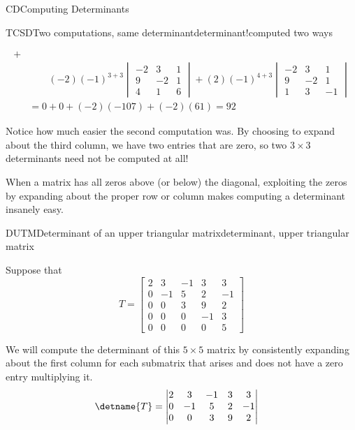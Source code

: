 \begin{subsect}{CD}{Computing Determinants}
\begin{example}{TCSD}{Two computations, same determinant}{determinant!computed two ways}
\begin{para}
\begin{align*}
+\\
%
&\quad\quad(-2)(-1)^{3+3}
\begin{vmatrix}
-2 & 3 & 1\\
9 & -2 & 1\\
4 & 1 & 6
\end{vmatrix}
+
(2)(-1)^{4+3}
\begin{vmatrix}
-2 & 3 & 1\\
9 & -2 & 1\\
1 & 3 & -1
\end{vmatrix}\\
&=0+0+(-2)(-107)+(-2)(61)=92
\end{align*}
\end{para}
%
\begin{para}Notice how much easier the second computation was.  By choosing to expand about the third column, we have two entries that are zero, so two $3\times 3$ determinants need not be computed at all!\end{para}
\end{example}
%
\begin{para}When a matrix has all zeros above (or below) the diagonal, exploiting the zeros by expanding about the proper row or column makes computing a determinant insanely easy.\end{para}
%
\begin{example}{DUTM}{Determinant of an upper triangular matrix}{determinant, upper triangular matrix}
\begin{para}Suppose that
%
\begin{equation*}
T=
\begin{bmatrix}
2 & 3 & -1 & 3 & 3\\
0 & -1 & 5 & 2 & -1\\
0 & 0 & 3 & 9 & 2\\
0 & 0 & 0 & -1 & 3\\
0 & 0 & 0 & 0 & 5
\end{bmatrix}
\end{equation*}
\end{para}
%
\begin{para}We will compute the determinant of this $5\times 5$ matrix by consistently expanding about the first column for each submatrix that arises and does not have a zero entry multiplying it.
%
\begin{align*}
\detname{T}&=
\begin{vmatrix}
2 & 3 & -1 & 3 & 3\\
0 & -1 & 5 & 2 & -1\\
0 & 0 & 3 & 9 & 2\\

\end{vmatrix}
\end{align*}
\end{para}
\end{example}
\end{subsect}
